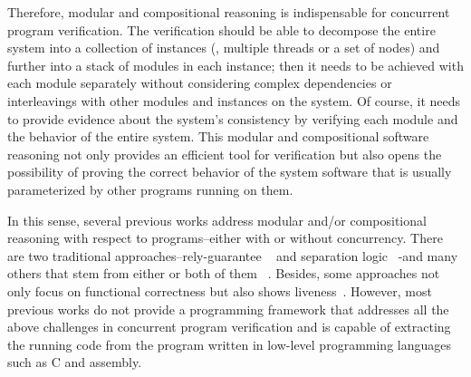 
Therefore, modular and compositional reasoning is indispensable for concurrent program verification. 
The verification should be able to decompose the entire system into a collection of instances (\ie, multiple threads or a set of nodes) and 
further into a stack of modules in each instance; then it needs to be achieved with each module separately without considering complex 
dependencies or interleavings with other modules and instances on the system. Of course, it needs to provide evidence about the system's 
consistency by verifying each module and the behavior of the entire system. 
This modular and compositional software reasoning not only provides an efficient tool for verification 
but also opens the possibility of proving the correct behavior of the system software that is usually parameterized by other programs running on them.
%

In this sense, several previous works address modular and/or compositional reasoning with respect to programs--either with or without concurrency.
There are two traditional approaches--rely-guarantee ~\cite{jones83} and separation logic ~\cite{ishtiaq01}-and many others 
that stem from either or both of them 
~\cite{feng07:sagl,vafeiadis:marriage,LRG,fu10:roch,sergey15, lili16,Vafeiadis11mfps, Yang07relsep,
Liang14lics}.
Besides, some approaches not only focus on functional correctness but also shows liveness~\cite{lili16}.
However, most previous works do not provide a programming framework that addresses all the above challenges
in concurrent program verification and is capable of extracting the running code from the program written in low-level programming 
languages such as C and assembly.



